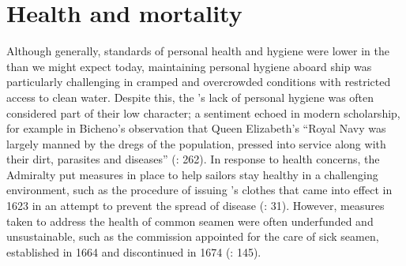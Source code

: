 \section{{Health and mortality}  }\label{sec:3.5}

Although generally, standards of personal health and hygiene were lower in the  than we might expect today, maintaining personal hygiene aboard ship was particularly challenging in cramped and overcrowded conditions with restricted access to clean water. Despite this, the ’s lack of personal hygiene was often considered part of their low character; a sentiment echoed in modern scholarship, for example in Bicheno’s observation that Queen Elizabeth’s “Royal Navy was largely manned by the dregs of the population, pressed into service along with their dirt, parasites and diseases” (\citeyear*{Bicheno2012}: 262). In response to health concerns, the Admiralty put measures in place to help sailors stay healthy in a challenging environment, such as the procedure of issuing ’s clothes that came into effect in 1623 in an attempt to prevent the spread of disease (\citealt{Brown2011}: 31). However, measures taken to address the health of common seamen were often underfunded and unsustainable, such as the commission appointed for the care of sick seamen, established in 1664 and discontinued in 1674 (\citealt{Lincoln2015}: 145).

